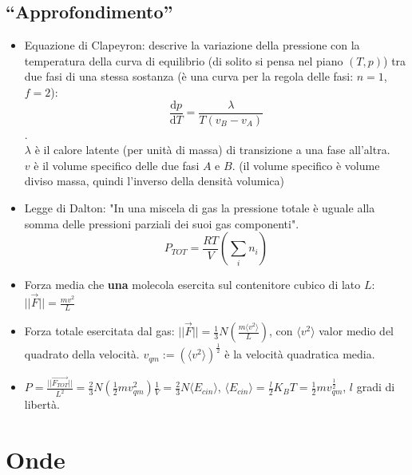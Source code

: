 \documentclass[10pt,a4paper]{article}
\newcommand{\de}{{\ensuremath{ \mbox{d}}}}
\newcommand{\norm}[1]{{\ensuremath{||{#1}||}}}
\newcommand{\ang}[1]{{\ensuremath{\langle {#1}\rangle}}}
\begin{document}
\begin{multicols}{2}
  \subsection*{``Approfondimento''}
  \begin{itemize}
  \item Equazione di Clapeyron: descrive la variazione della pressione con la temperatura della curva di equilibrio (di solito si pensa nel piano $(T,p)$) tra due fasi di una stessa sostanza (è una curva per la regola delle fasi: $n=1$, $f=2$): $$\frac{\de p}{\de T} =\frac{\lambda}{T (v_B - v_A)}$$. \\
  $\lambda$ è il calore latente (per unità di massa) di transizione a una fase all'altra. \\
  $v$ è il volume specifico delle due fasi $A$ e $B$. (il volume specifico è volume diviso massa, quindi l'inverso della densità volumica)
  \item Legge di Dalton: "In una miscela di gas la pressione totale \`e uguale alla somma delle pressioni parziali dei suoi gas componenti". $$P_{TOT} = \frac{RT}{V}\left( \sum_{i} n_i \right)$$
  \item Forza media che {\bf una} molecola esercita sul contenitore cubico di lato $L$: $\norm{\vec{F}} = \frac{mv^2}{L}$
  \item Forza totale esercitata dal gas: $\norm{\vec{F}} = \frac{1}{3}N \left(\frac{m \ang{v^2}}{L} \right)$, con $\ang{v^2}$ valor medio del quadrato della velocit\`a. $v_{qm} := (\ang{v^2})^{\frac{1}{2}}$ \`e la velocit\`a quadratica media.
  \item $P = \frac{\norm{\vec{F_{TOT}}}}{L^2} = \frac{2}{3} N \left(\frac{1}{2}m {v_{qm}^{2}} \right) \frac{1}{V} = \frac{2}{3} N \ang{E_{cin}}$, $\ang{E_{cin}} = \frac{l}{2}K_BT = \frac{1}{2}m{v_{qm}^\frac{1}{2}}$, $l$ gradi di libert\`a.
  \end{itemize}

  \clearpage
  
  \section{Onde}

\end{multicols}
\end{document}
